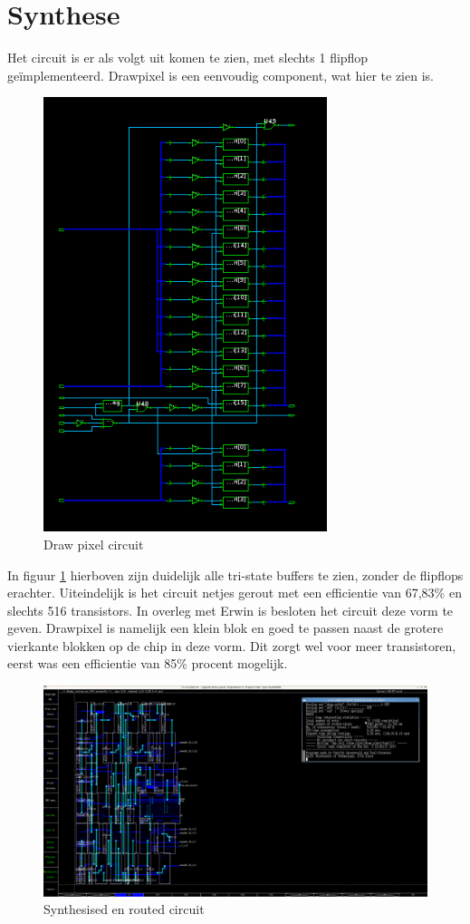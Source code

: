 \documentclass{scrreprt} %
\begin{document}
\section{Synthese}
Het circuit is er als volgt uit komen te zien, met slechts 1 flipflop geïmplementeerd. Drawpixel is een eenvoudig component, wat hier te zien is. 
\begin{figure} [h!]
\centering
\includegraphics [scale = 0.8] {inputfiles/dp_circ}
\caption{Draw pixel circuit}
\label{fig:dpcircuit}
\end{figure}

\newpage 


In figuur \ref{fig:dpcircuit} hierboven zijn duidelijk alle tri-state buffers te zien, zonder de flipflops erachter. Uiteindelijk is het circuit netjes gerout met een efficientie van 67,83\% en slechts 516 transistors. In overleg met Erwin is besloten het circuit deze vorm te geven. Drawpixel is namelijk een klein blok en goed te passen naast de grotere vierkante blokken op de chip in deze vorm. Dit zorgt wel voor meer transistoren, eerst was een efficientie van 85\% procent mogelijk. 
\begin{figure} [h!]
\includegraphics [width = \textwidth] {inputfiles/dp_trout}
\caption{Synthesised en routed circuit}
\label{fig:dplayout}
\end{figure}
\end{document}
